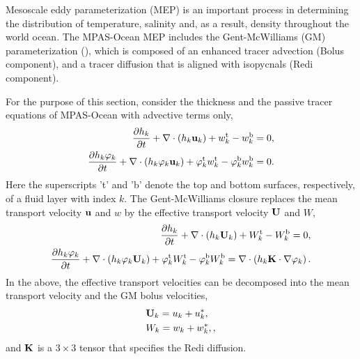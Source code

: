 

Mesoscale eddy parameterization (MEP) is an important process in determining the distribution of temperature, salinity and, as a result, density throughout the world ocean.   The MPAS-Ocean MEP includes the Gent-McWilliams (GM) parameterization (\cite{Gent_McWilliams90jpo,Gent_ea95jpo,Gent2011om}), which is composed of an enhanced tracer advection (Bolus component), and a tracer diffusion that is aligned with isopycnals (Redi component).

For the purpose of this section, consider the thickness and the passive tracer equations of MPAS-Ocean with advective terms only,
\begin{align}   
\dfrac{\partial h_k}{\partial t} 
 + \nabla \cdot \left( h_k {\bf u}_k \right) 
 + w_k^\textrm{t} - w_k^\textrm{b} = 0\label{ocean:GM:\mode_1},
\\
\dfrac{\partial h_k\varphi_k}{\partial t} 
 + \nabla \cdot \left( h_k\varphi_k {\bf u}_k \right) 
  + \varphi_k^\textrm{t} w_k^\textrm{t} - \varphi_k^\textrm{b} w_k^\textrm{b}
= 0.\label{ocean:GM:\mode_4}
\end{align}
Here the superscripts 't' and 'b' denote the top and bottom surfaces,
respectively, of a fluid layer with index $k$.
The Gent-McWilliams closure replaces the mean transport velocity ${\bf u}$
and $w$ by the effective transport velocity ${\bf U}$ and $W$,
\begin{align}   
\dfrac{\partial h_k}{\partial t} 
 + \nabla \cdot \left( h_k {\bf U}_k \right) 
 + W_k^\textrm{t} - W_k^\textrm{b} = 0,\label{ocean:GM:\mode_5}
\\
\dfrac{\partial h_k\varphi_k}{\partial t} 
 + \nabla \cdot \left( h_k\varphi_k{\bf U}_k \right) 
  + \varphi_k^\textrm{t} W_k^\textrm{t} - \varphi_k^\textrm{b} W_k^\textrm{b}  
= \nabla\cdot\left(h_k {\bf K} \cdot \nabla\varphi_k \right).\label{ocean:GM:\mode_6}
\end{align}
In the above, the effective transport velocities can be decomposed
into the mean transport velocity and the GM bolus velocities, 
\begin{align}
&{\bf U}_k = u_k + u^\ast_k,\label{ocean:GM:\mode_7}\\ 
& W_k = w_k + w^\ast_k,\label{ocean:GM:\mode_8},
\end{align}
and ${\bf K}$ is a $3\times 3$ tensor that specifies the Redi diffusion.

